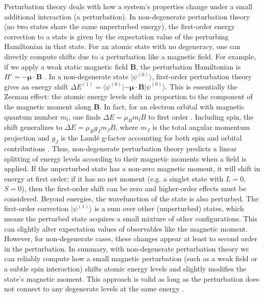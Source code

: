\documentclass[12pt]{article}
\begin{document}
        Perturbation theory deals with how a system’s properties change under a small additional interaction (a perturbation). In non-degenerate perturbation theory (no two states share the same unperturbed energy), the first-order energy correction to a state is given by the expectation value of the perturbing Hamiltonian in that state. For an atomic state with no degeneracy, one can directly compute shifts due to a perturbation like a magnetic field. For example, if we apply a weak static magnetic field $\mathbf{B}$, the perturbation Hamiltonian is $H' = -\boldsymbol{\mu}\cdot \mathbf{B}$ \cite{ZeemanW}. In a non-degenerate state $|\psi^{(0)}\rangle$, first-order perturbation theory gives an energy shift $\Delta E^{(1)} = \langle \psi^{(0)}| -\boldsymbol{\mu}\cdot \mathbf{B} |\psi^{(0)}\rangle$. This is essentially the Zeeman effect: the atomic energy levels shift in proportion to the component of the magnetic moment along $\mathbf{B}$. In fact, for an electron orbital with magnetic quantum number $m_l$, one finds $\Delta E = \mu_B m_l B$ to first order \cite{Zeeman}. Including spin, the shift generalizes to $\Delta E = \mu_B g_J m_J B$, where $m_J$ is the total angular momentum projection and $g_J$ is the Landé g-factor accounting for both spin and orbital contributions \cite{ZeemanW}. Thus, non-degenerate perturbation theory predicts a linear splitting of energy levels according to their magnetic moments when a field is applied. If the unperturbed state has a non-zero magnetic moment, it will shift in energy at first order; if it has no net moment (e.g. a singlet state with $L=0$,  $S=0$), then the first-order shift can be zero and higher-order effects must be considered. Beyond energies, the wavefunction of the state is also perturbed. The first-order correction $|\psi^{(1)}\rangle$ is a sum over other (unperturbed) states, which means the perturbed state acquires a small mixture of other configurations. This can slightly alter expectation values of observables like the magnetic moment. However, for non-degenerate cases, these changes appear at least to second order in the perturbation. In summary, with non-degenerate perturbation theory we can reliably compute how a small magnetic perturbation (such as a weak field or a subtle spin interaction) shifts atomic energy levels and slightly modifies the state’s magnetic moment. This approach is valid as long as the perturbation does not connect to any degenerate levels at the same energy \cite{PerturbationTheory}.
        
\end{document}
